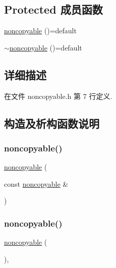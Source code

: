 \subsection*{Protected 成员函数}
\begin{DoxyCompactItemize}
\item 
\hyperlink{classmuduo_1_1noncopyable_a9a7cb0757f3a96b9862062e348f20577}{noncopyable} ()=default
\item 
\hyperlink{classmuduo_1_1noncopyable_a60dec0098f04c2bedcf32fc41e8bd203}{$\sim$noncopyable} ()=default
\end{DoxyCompactItemize}


\subsection{详细描述}


在文件 noncopyable.\+h 第 7 行定义.



\subsection{构造及析构函数说明}
\mbox{\label{classmuduo_1_1noncopyable_aaefac0158453c4de9989d742a02fdc61}} 
\subsubsection{\texorpdfstring{noncopyable()}{noncopyable()}\hspace{0.1cm}{\footnotesize\ttfamily [1/2]}}
{\footnotesize\ttfamily \hyperlink{classmuduo_1_1noncopyable}{noncopyable} (\begin{DoxyParamCaption}\item[{const \hyperlink{classmuduo_1_1noncopyable}{noncopyable} \&}]{ }\end{DoxyParamCaption})\hspace{0.3cm}{\ttfamily [delete]}}

\mbox{\label{classmuduo_1_1noncopyable_a9a7cb0757f3a96b9862062e348f20577}} 
\subsubsection{\texorpdfstring{noncopyable()}{noncopyable()}\hspace{0.1cm}{\footnotesize\ttfamily [2/2]}}
{\footnotesize\ttfamily \hyperlink{classmuduo_1_1noncopyable}{noncopyable} (\begin{DoxyParamCaption}{ }\end{DoxyParamCaption})\hspace{0.3cm}{\ttfamily [protected]}, {\ttfamily [default]}}

